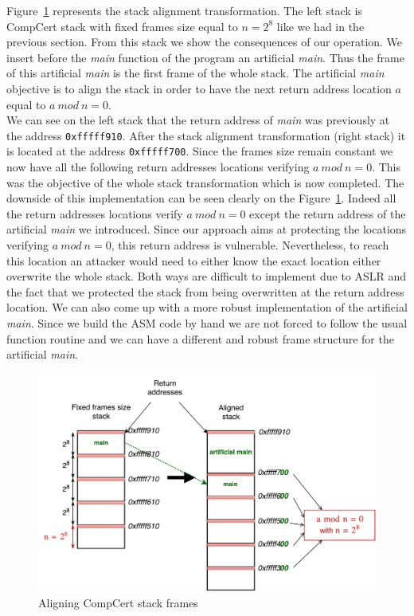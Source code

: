 \documentclass[11pt]{sdm}
\begin{document}
Figure~\ref{stack_align} represents the stack alignment transformation. The left stack is CompCert stack with fixed frames size equal to $n=2^8$ like we had in the previous section. From this stack we show the consequences of our operation. We insert before the \textit{main} function of the program an artificial \textit{main}. Thus the frame of this artificial \textit{main} is the first frame of the whole stack. The artificial \textit{main} objective is to align the stack in order to have the next return address location $a$ equal to $a~mod~n=0$. \\
We can see on the left stack that the return address of \textit{main} was previously at the address \texttt{0xfffff910}. After the stack alignment transformation (right stack) it is located at the address \texttt{0xfffff700}. Since the frames size remain constant we now have all the following return addresses locations verifying $a~mod~n=0$. This was the objective of the whole stack transformation which is now completed.
The downside of this implementation can be seen clearly on the Figure~\ref{stack_align}. Indeed all the return addresses locations verify $a~mod~n=0$ except the return address of the artificial \textit{main} we introduced.
Since our approach aims at protecting the locations verifying $a~mod~n=0$, this return address is vulnerable.
Nevertheless, to reach this location an attacker would need to either know the exact location either overwrite the whole stack. Both ways are difficult to implement due to ASLR and the fact that we protected the stack from being overwritten at the return address location. We can also come up with a more robust implementation of the artificial \textit{main}. Since we build the ASM code by hand we are not forced to follow the usual function routine and we can have a different and robust frame structure for the artificial \textit{main}.

\begin{figure}[!ht]
\centering
\includegraphics[scale=0.6]{images/stack_align.pdf}
\caption{Aligning CompCert stack frames}
\label{stack_align}
\end{figure}
\end{document}
